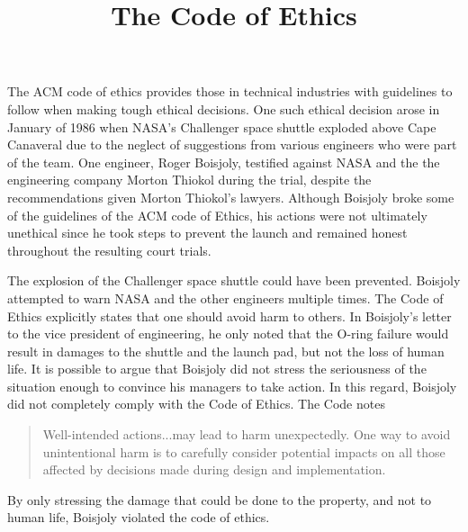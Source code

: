 \documentclass{paper}
\title{The Code of Ethics}
\begin{document}
\finalh{}
\inlinetitle

\begin{linenumbers}

The ACM code of ethics provides those in technical industries with guidelines to follow when making tough ethical decisions. One such ethical decision arose in January of 1986 when NASA's Challenger space shuttle exploded above Cape Canaveral due to the neglect of suggestions from various engineers who were part of the team. One engineer, Roger Boisjoly, testified against NASA and the the engineering company Morton Thiokol during the trial, despite the recommendations given Morton Thiokol's lawyers. Although Boisjoly broke some of the guidelines of the ACM code of Ethics, his actions were not ultimately unethical since he took steps to prevent the launch and remained honest throughout the resulting court trials.

The explosion of the Challenger space shuttle could have been prevented. Boisjoly attempted to warn NASA and the other engineers multiple times. The Code of Ethics explicitly states that one should avoid harm to others. In Boisjoly's letter to the vice president of engineering, he only noted that the O-ring failure would result in damages to the shuttle and the launch pad, but not the loss of human life. It is possible to argue that Boisjoly did not stress the seriousness of the situation enough to convince his managers to take action. In this regard, Boisjoly did not completely comply with the Code of Ethics. The Code notes
\begin{quote}
Well-intended actions...may lead to harm unexpectedly. One way to avoid unintentional harm is to carefully consider potential impacts on all those affected by decisions made during design and implementation.
\end{quote}
By only stressing the damage that could be done to the property, and not to human life, Boisjoly violated the code of ethics.


\end{linenumbers}
\end{document}

